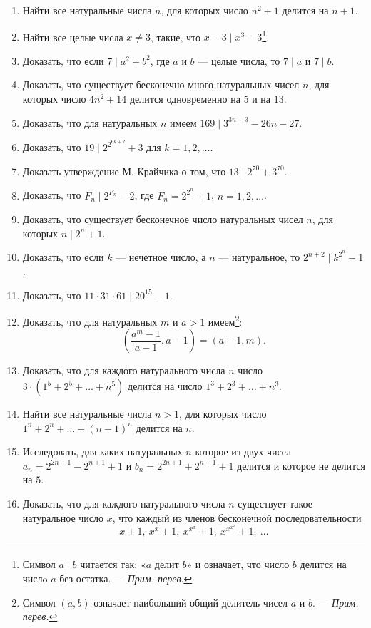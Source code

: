\documentclass[12pt, a4paper, openany]{book}
\begin{document}
\begin{enumerate} 
\item Найти все натуральные числа $n$, для которых число $n^2+1$ делится на $n+1$.
\item Найти все целые числа $x \neq 3$, такие, что $x - 3 \mid x^3 - 3${\footnote{Символ $a \mid b$ читается так: «$a$ делит $b$» и означает, что число $b$ делится на числo $a$ без остатка. — \textit{Прим. перев}.}}.
\item Доказать, что если $7 \mid a^2 + b^2$, где $a$ и $b$ — целые числа, то $7 \mid a$ и $7 \mid b$.
\item Доказать, что существует бесконечно много натуральных чисел $n$, для которых число $4n^2+14$ делится одновременно на $5$ и на $13$.
\item Доказать, что для натуральных $n$ имеем $169 \mid 3^{3n+3} - 26n - 27$.
\item Доказать, что $19 \mid 2^{2^{6k+2}} + 3$ для $k=1, 2, \ldots$.
\item Доказать утверждение М. Крайчика о том, что $13 \mid 2^{70}+3^{70}$.
\item Доказать, что $F_n \mid 2^{F_n} - 2$, где $F_n=2^{2^n}+1$, $n=1, 2, \ldots$.
\item Доказать, что существует бесконечное число натуральных чисел $n$, для которых $n \mid 2^n+1$.
\item Доказать, что если $k$ — нечетное число, а $n$ — натуральное, то $2^{n+2} \mid k^{2^{n}}-1$.
\item Доказать, что $11\cdot31\cdot61 \mid 20^{15}-1$.
\item Доказать, что для натуральных $m$ и $a>1$ имеем{\footnote{Символ $(a, b)$ означает наибольший общий делитель чисел $a$ и $b$. — \textit{Прим. перев.}}}:
$$
\left( \frac{a^m - 1}{a-1}, a-1 \right) = (a-1, m).
$$
\item Доказать, что для каждого натурального числа $n$ число $3\cdot(1^5+2^5+\ldots+n^5)$ делится на число $1^3+2^3+\ldots+n^3$.
\item Найти все натуральные числа $n>1$, для которых число $1^n+2^n+\ldots+(n-1)^n$ делится на $n$.
\item Исследовать, для каких натуральных $n$ которое из двух чисел $a_n=2^{2n+1}-2^{n+1}+1$ и $b_n=2^{2n+1}+2^{n+1}+1$  делится и которое не делится на $5$.
\item Доказать, что для каждого натурального числа $n$ существует такое натуральное число $x$, что каждый из членов бесконечной последовательности 
$$
x+1,\     x^{x}+1,\     x^{x^{x}}+1,\      x^{x^{x^{x}}}+1,\    \ldots
$$
\end{enumerate}
\end{document}
